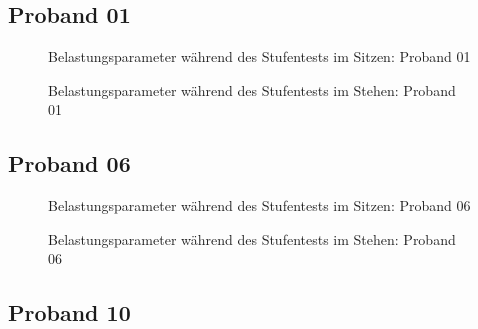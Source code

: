 \documentclass[
  letterpaper,
  DIV=11]{scrartcl}
\begin{document}
\subsection{Proband 01}

\begin{figure}


\caption{\label{fig-ST1_1}Belastungsparameter während des Stufentests im
Sitzen: Proband 01}

\end{figure}%

\begin{figure}


\caption{\label{fig-ST2_1}Belastungsparameter während des Stufentests im
Stehen: Proband 01}

\end{figure}%

\subsection{Proband 06}

\begin{figure}


\caption{\label{fig-ST1_6}Belastungsparameter während des Stufentests im
Sitzen: Proband 06}

\end{figure}%

\begin{figure}


\caption{\label{fig-ST2_6}Belastungsparameter während des Stufentests im
Stehen: Proband 06}

\end{figure}%

\subsection{Proband 10}
\end{document}
